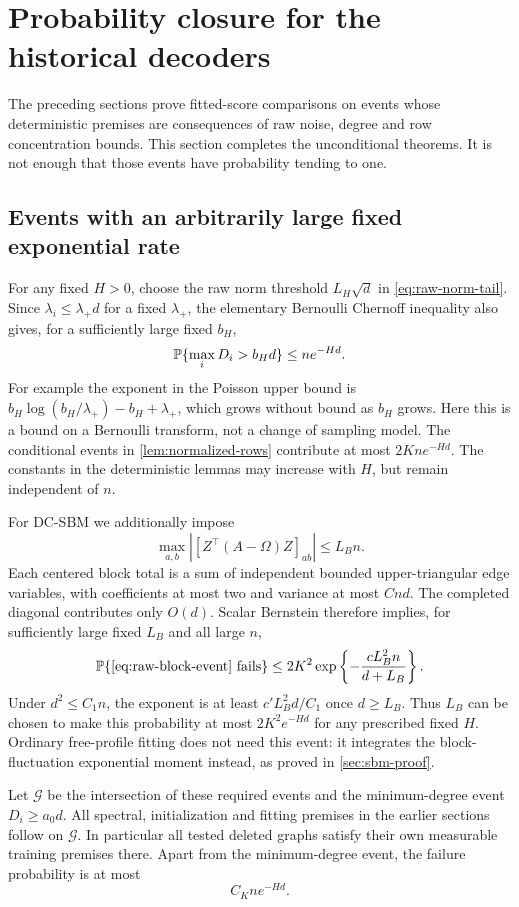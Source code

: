 \section{Probability closure for the historical decoders}
\label{sec:probability}

The preceding sections prove fitted-score comparisons on events whose
deterministic premises are consequences of raw noise, degree and row
concentration bounds. This section completes the unconditional theorems.
It is not enough that those events have probability tending to one.

\subsection{Events with an arbitrarily large fixed exponential rate}

For any fixed $H>0$, choose the raw norm threshold $L_H\sqrt d$ in
\eqref{eq:raw-norm-tail}. Since $\lambda_i\le\lambda_+d$ for a fixed
$\lambda_+$, the elementary Bernoulli Chernoff inequality also gives,
for a sufficiently large fixed $b_H$,
\[
 \mathbb P\{\max_iD_i>b_Hd\}\le ne^{-Hd}.
\]
For example the exponent in the Poisson upper bound is
$b_H\log(b_H/\lambda_+)-b_H+\lambda_+$, which grows without bound as
$b_H$ grows. Here this is a bound on a Bernoulli transform, not a change
of sampling model.
The conditional events in \cref{lem:normalized-rows} contribute at most
$2Kn e^{-Hd}$. The constants in the deterministic lemmas may increase
with $H$, but remain independent of $n$.

For DC-SBM we additionally impose
\begin{equation}\label{eq:raw-block-event}
 \max_{a,b}|[Z^\top(A-\Omega)Z]_{ab}|\le L_Bn.
\end{equation}
Each centered block total is a sum of independent bounded upper-triangular
edge variables, with coefficients at most two and variance at most $Cnd$.
The completed diagonal contributes only $O(d)$.
Scalar Bernstein therefore implies, for sufficiently large fixed $L_B$
and all large $n$,
\[
 \mathbb P\{\eqref{eq:raw-block-event}\text{ fails}\}
 \le 2K^2\exp\left\{-\frac{cL_B^2 n}{d+L_B}\right\}.
\]
Under $d^2\le C_1n$, the exponent is at least
$c'L_B^2d/C_1$ once $d\ge L_B$. Thus $L_B$ can be chosen to make this
probability at most $2K^2e^{-Hd}$ for any prescribed fixed $H$.
Ordinary free-profile fitting does not need this event: it integrates the
block-fluctuation exponential moment instead, as proved in
\cref{sec:sbm-proof}.

Let $\mathcal G$ be the intersection of these required events and the
minimum-degree event $D_i\ge a_0d$. All spectral, initialization and fitting
premises in the earlier sections follow on $\mathcal G$.
In particular all tested deleted graphs satisfy their own measurable
training premises there. Apart from the minimum-degree event, the failure
probability is at most
\begin{equation}\label{eq:other-bad-events}
 C_Kne^{-Hd}.
\end{equation}

